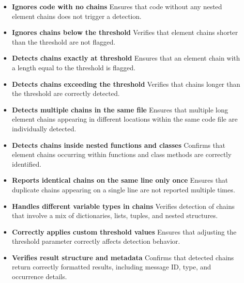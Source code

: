 \documentclass[12pt, titlepage]{article}
\begin{document}
\begin{itemize}
\item \textbf{Ignores code with no chains} \newline
Ensures that code without any nested element chains does not trigger a detection.
\item \textbf{Ignores chains below the threshold} \newline
Verifies that element chains shorter than the threshold are not flagged.

\item \textbf{Detects chains exactly at threshold} \newline
Ensures that an element chain with a length equal to the threshold is flagged.

\item \textbf{Detects chains exceeding the threshold} \newline
Verifies that chains longer than the threshold are correctly detected.

\item \textbf{Detects multiple chains in the same file} \newline
Ensures that multiple long element chains appearing in different locations within the same code file are individually detected.

\item \textbf{Detects chains inside nested functions and classes} \newline
Confirms that element chains occurring within functions and class methods are correctly identified.

\item \textbf{Reports identical chains on the same line only once} \newline
Ensures that duplicate chains appearing on a single line are not reported multiple times.

\item \textbf{Handles different variable types in chains} \newline
Verifies detection of chains that involve a mix of dictionaries, lists, tuples, and nested structures.

\item \textbf{Correctly applies custom threshold values} \newline
Ensures that adjusting the threshold parameter correctly affects detection behavior.

\item \textbf{Verifies result structure and metadata} \newline
Confirms that detected chains return correctly formatted results, including message ID, type, and occurrence details.
\end{itemize}
\end{document}
